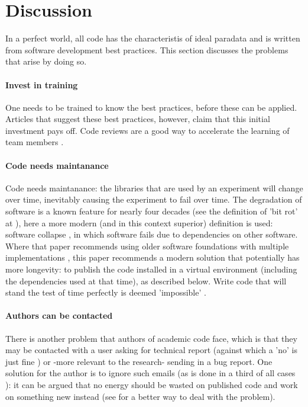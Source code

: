 \section{Discussion}

In a perfect world, all code has the characteristis of ideal paradata
and is written from software development best practices.
This section discusses the problems that arise by doing so.

\paragraph{Invest in training}

One needs to be trained to know the best practices,
before these can be applied. 
Articles that suggest these best practices, however, claim that this initial
investment pays off.
Code reviews are a good way to accelerate the 
learning of team members \cite{vable2021code}.

\paragraph{Code needs maintanance}

Code needs maintanance:
the libraries that are used by an experiment
will change over time, inevitably causing the experiment to fail
over time. 
The degradation of software is a known feature for nearly 
four decades (see the definition of 'bit rot' at \cite{steele1983hacker}),
here a more modern (and in this context superior)
definition is used: software collapse \cite{hinsen2019dealing},
in which software fails due to dependencies on other 
software.
Where that paper recommends using older software foundations 
with multiple implementations \cite{hinsen2019dealing},
this paper recommends a modern solution that potentially has more 
longevity:
to publish the code installed in a virtual environment
(including the dependencies used at that time), as described below.
Write code that will stand the test of time perfectly
is deemed 'impossible' \cite{benureau2018re}.

\paragraph{Authors can be contacted}

There is another problem that authors of academic code face,
which is that they may be contacted with a user 
asking for technical report 
(against which a 'no' is just fine \cite{barnes2010publish})
or -more relevant to the research- sending in a bug report.
One solution for the author is to ignore such emails (as is done in a third
of all cases \cite{teunis2015corresponding}):
it can be argued that no energy should be wasted on published code
and work on something new instead 
(see \cite{barnes2010publish} for a better way to deal with the problem).

